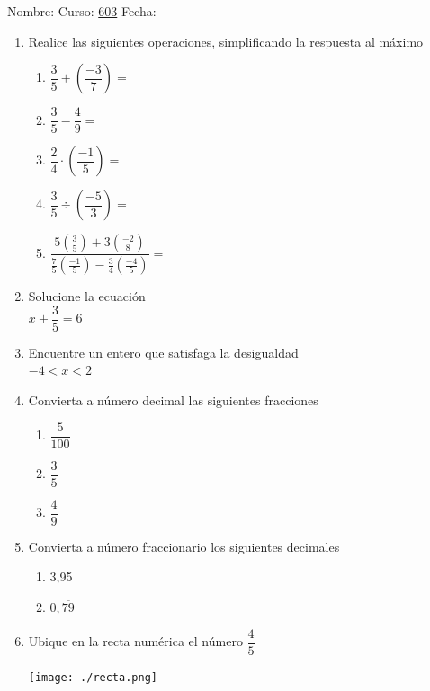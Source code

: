 \documentclass[fleqn]{article}
\newcommand{\LineaNombre}{%
\par
\vspace{\baselineskip}
Nombre:\hrulefill \; Curso: \underline{603} \; Fecha: \underline{\hspace*{2.5cm}} \relax
\par}
\begin{document}
\LineaNombre
\begin{enumerate}
 \item Realice las siguientes operaciones, simplificando la respuesta al máximo
\begin{enumerate}
 \item $\dfrac{3}{5}+\left(\dfrac{-3}{7}\right)=$\noanswer
\item $\dfrac{3}{5}-\dfrac{4}{9}=$\noanswer
\item $\dfrac{2}{4}\cdot\left(\dfrac{-1}{5}\right)=$\noanswer
\item $\dfrac{3}{5}\div\left(\dfrac{-5}{3}\right)=$\noanswer
\item $\dfrac{5\left(\frac{3}{5}\right)+3\left(\frac{-2}{8}\right)}{\frac{7}{5}\left(\frac{-1}{5}\right)-\frac{3}{4}\left(\frac{-4}{5}\right)}=$\noanswer
\end{enumerate}
\item Solucione la ecuación \\$x+\dfrac{3}{5}=6$\\ \vspace{1cm}
\item Encuentre un entero que satisfaga la desigualdad\\$-4<x<2$\\ \vspace{1cm}
\item Convierta a número decimal las siguientes fracciones\\
\begin{enumerate}
 \item $\dfrac{5}{100}$\\ \vspace{0,5cm}
\item $\dfrac{3}{5}$\\ \vspace{0,5cm}
\item $\dfrac{4}{9}$\\ \vspace{0,5cm}
\end{enumerate}
\item Convierta a número fraccionario los siguientes decimales
\begin{enumerate}
\item 3,95\\ \vspace{1cm}
\item $0,\overline{79}$ \\ \vspace{4cm}
\end{enumerate}
\item Ubique en la recta numérica el número $\dfrac{4}{5}$
\begin{center}
 \texttt{[image: ./recta.png]}
\end{center}
\end{enumerate}
\end{document}
